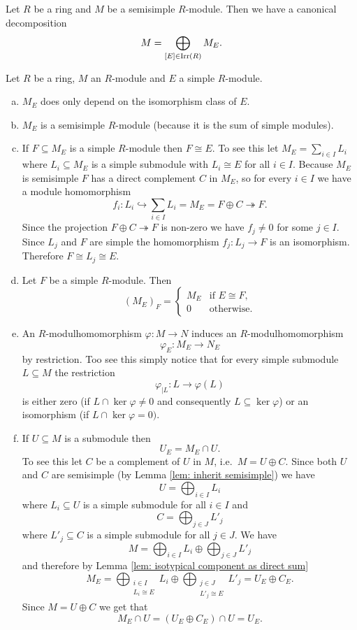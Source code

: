 \begin{cor}\label{cor: canonical decomposition semisimple module}
 Let $R$ be a ring and $M$ be a semisimple $R$-module. Then we have a canonical decomposition
 \[
  M = \bigoplus_{[E] \in \operatorname{Irr}(R)} M_E.
 \]
\end{cor}


\begin{rem}
  Let $R$ be a ring, $M$ an $R$-module and $E$ a simple $R$-module.
 \begin{enumerate}[a)]
  \item
  $M_E$ does only depend on the isomorphism class of $E$.
  \item
  $M_E$ is a semisimple $R$-module (because it is the sum of simple modules).
  \item
  If $F \subseteq M_E$ is a simple $R$-module then $F \cong E$. To see this let $M_E = \sum_{i \in I} L_i$ where $L_i \subseteq M_E$ is a simple submodule with $L_i \cong E$ for all $i \in I$. Because $M_E$ is semisimple $F$ has a direct complement $C$ in $M_E$, so for every $i \in I$ we have a module homomorphism
  \[
   f_i \colon L_i \hookrightarrow \sum_{i \in I} L_i = M_E = F \oplus C \twoheadrightarrow F.
  \]
  Since the projection $F \oplus C \twoheadrightarrow F$ is non-zero we have $f_j \neq 0$ for some $j \in I$. Since $L_j$ and $F$ are simple the homomorphism $f_j \colon L_j \to F$ is an isomorphism. Therefore $F \cong L_j \cong E$.
  \item
  Let $F$ be a simple $R$-module. Then
  \[
   (M_E)_F =
   \begin{cases}
    M_E & \text{if } E \cong F, \\
      0 & \text{otherwise}.
   \end{cases}
  \]
  \item
  An $R$-modulhomomorphism $\varphi \colon M \to N$ induces an $R$-modulhomomorphism
  \[
   \varphi_E \colon M_E \to N_E
  \]
  by restriction. Too see this simply notice that for every simple submodule $L \subseteq M$ the restriction
  \[
   \varphi_{|L} \colon L \to \varphi(L)
  \]
  is either zero (if $L \cap \ker \varphi \neq 0$ and consequently $L \subseteq \ker \varphi$) or an isomorphism (if $L \cap \ker \varphi = 0)$.
  \item
  If $U \subseteq M$ is a submodule then
  \[
   U_E = M_E \cap U.
  \]
  To see this let $C$ be a complement of $U$ in $M$, i.e.\ $M = U \oplus C$. Since both $U$ and $C$ are semisimple (by Lemma \ref{lem: inherit semisimple}) we have
  \[
   U = \bigoplus_{i \in I} L_i
  \]
  where $L_i \subseteq U$ is a simple submodule for all $i \in I$ and
  \[
   C = \bigoplus_{j \in J} L'_j
  \]
  where $L'_j \subseteq C$ is a simple submodule for all $j \in J$. We have
  \[
   M = \bigoplus_{i \in I} L_i \oplus \bigoplus_{j \in J} L'_j
  \]
  and therefore by Lemma \ref{lem: isotypical component as direct sum}
  \[
   M_E
   = \bigoplus_{\substack{i \in I \\ L_i \cong E}} L_i \oplus \bigoplus_{\substack{j \in J \\ L'_j \cong E}} L'_j
   = U_E \oplus C_E.
  \]
  Since $M = U \oplus C$ we get that
  \[
   M_E \cap U = (U_E \oplus C_E) \cap U = U_E.
  \]
 \end{enumerate}
\end{rem}


